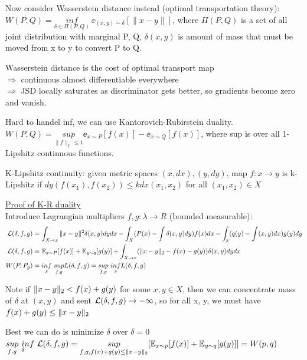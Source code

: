 \documentclass[12pt,a4paper]{article}
\begin{document}
Now consider Wasserstein distance instead (optimal transportation theory):\\
$W(P,Q)=\underset{\delta\in \Pi(P,Q)}{inf}\ \ee_{(x,y)\sim \delta}[\|x-y\|]$, where $\Pi(P,Q)$ is a set of all joint distribution with marginal P, Q, $\delta(x,y)$ is amount of mass that must be moved from x to y to convert P to Q. 

Wasserstein distance is the cost of optimal transport map\\
$\Rightarrow$ continuous almost differentiable everywhere\\
$\Rightarrow$ JSD locally saturates as discriminator gets better, so gradients become zero and vanish. 

\vspace{0.5cm}
Hard to handel inf, we can use Kantorovich-Rubirstein duality.\\
$W(P,Q)=\underset{\|f\|_L\le 1}{sup} \ee_{x\sim P}[f(x)]-\ee_{x\sim Q}[f(x)]$, where sup is over all 1-Lipshitz continuous functions. 

K-Lipshitz continuity: given metric spaces $(x,dx), (y,dy)$, map $f: x\rightarrow y$ is k-Lipshitz if $dy(f(x_1), f(x_2))\le k dx(x_1, x_2)$ for all $(x_1, x_2)\in X$


\vspace{0.5cm}
\underline{Proof of K-R duality}\\
Introduce Lagrangian multipliers $f,g: \lambda\rightarrow R$ (bounded measurable):\\ 
\begin{equation}
    \begin{split}
\mathcal{L}(\delta, f,g)& =\int_{X\rightarrow x} \|x-y\|^2 \delta(x,y)dydx-\int_X(P(x)-\int \delta(x,y)dy)f(x)dx-\int_x(q(y)-\int(x,y)dx)g(y)dy\\
\mathcal{L}(\delta, f, g) &= \mathbb{E}_{x\sim P}[f(x)]+\mathbb{E}_{y\sim q}[g(y)] +\int_{X\rightarrow x} (\|x-y\|_2-f(x)-g(y)) \delta(x,y) dydx \\
W(P, P_g) &=\underset{\delta}{inf}\ \underset{f,g}{sup} L(\delta,f,g) = \underset{f,g}{sup}\ \underset{\delta}{inf} L(\delta, f,g)
    \end{split}
\end{equation}

Note if $\|x-y\|_2<f(x)+g(y)$ for some $x,y\in X$, then we can concentrate mass of $\delta$ at $(x,y)$ and sent $\mathcal{L} (\delta, f,g)\rightarrow -\infty$, so for all x, y, we must have $f(x)+g(y)\le \|x-y\|_2$

Best we can do is minimize $\delta$ over $\delta=0$\\
$\underset{f,g}{sup}\ \underset{\delta}inf\ \lossl(\delta, f,g)=\underset{f,g,f(x)+g(y)\le \norm{x-y}}{sup} [\ee_{x\sim p}[f(x)]+\ee_{y\sim q}[g(y)]]=W(p,q)$
\end{document}
